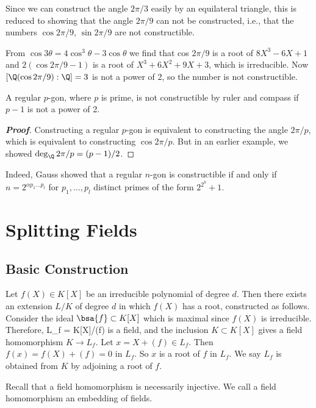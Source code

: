 Since we can construct the angle $2\pi /3$ easily by an equilateral triangle, this is reduced to showing that the angle $2\pi /9$ can not be constructed, i.e., that the numbers $\cos 2\pi /9$, $\sin 2\pi /9$ are not constructible.

From $\cos 3\theta = 4 \cos^3 \theta - 3 \cos \theta$ we find that cos $2\pi /9$ is a root of $8X^3 - 6X + 1$ and $2 (\cos 2\pi /9 - 1)$ is a root of $X^3+6X^2+9X+3$, which is irreducible. Now $[\Q(\cos 2\pi /9): \Q] = 3$ is not a power of 2, so the number is not constructible.

\begin{proposition}
A regular $p$-gon, where $p$ is prime, is not constructible by ruler and compass if $p - 1$ is not a power of 2.
\end{proposition}

\begin{proof}[\bf Proof]
Constructing a regular $p$-gon is equivalent to constructing the angle $2\pi /p$, which is equivalent to constructing $\cos 2\pi /p$. But in an earlier example, we showed $\deg_\Q 2\pi /p = (p - 1)/2$.
\end{proof}


Indeed, Gauss showed that a regular $n$-gon is constructible if and only if $n = 2^{\alpha p_1\dots p_l}$ for $p_1, \dots , p_l$ distinct primes of the form $2^{2^k} + 1$.

\section{Splitting Fields}

\subsection{Basic Construction}

Let $f(X) \in K[X]$ be an irreducible polynomial of degree $d$. Then there exists an extension $L/K$ of degree $d$ in which $f(X)$ has a root, constructed as follows. Consider the ideal $\bsa{f} \subset K[X]$ which is maximal since $f(X)$ is irreducible. Therefore,
\be
L_f = K[X]/(f)
\ee
is a field, and the inclusion $K \subset K[X]$ gives a field homomorphism $K \to L_f$. Let $x = X + (f) \in L_f$. Then $f(x) = f(X) + (f) = 0$ in $L_f$. So $x$ is a root of $f$ in $L_f$. We say $L_f$ is obtained from $K$ by adjoining a root of $f$.

Recall that a field homomorphism is necessarily injective. We call a field homomorphism an embedding of fields.

